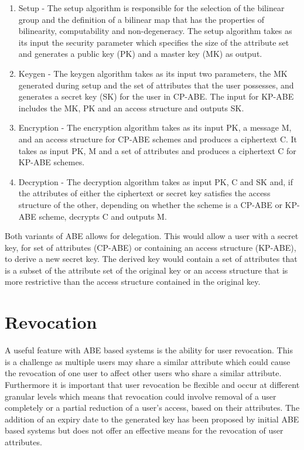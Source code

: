 \begin{enumerate}
	
	\item Setup -  The setup algorithm is responsible for the selection of the bilinear group and the definition of a bilinear map that has the properties of bilinearity, computability and non-degeneracy. The setup algorithm takes as its input the security parameter which specifies the size of the attribute set and generates a public key (PK) and a master key (MK) as output.
	
	\item Keygen - The keygen algorithm takes as its input two parameters, the MK generated during setup and the set of attributes that the user possesses, and generates a secret key (SK) for the user in CP-ABE. The input for KP-ABE includes the MK, PK and an access structure and outputs SK.
	
	\item Encryption - The encryption algorithm takes as its input PK, a message M, and an access structure for CP-ABE schemes and produces a ciphertext C. It takes as input PK, M and a set of attributes and produces a ciphertext C for KP-ABE schemes.
	
	\item Decryption - The decryption algorithm takes as input PK, C and SK and, if the attributes of either the ciphertext or secret key satisfies the access structure of the other, depending on whether the scheme is a CP-ABE or KP-ABE scheme, decrypts C and outputs M.
	
\end{enumerate}

Both variants of ABE allows for delegation. This would allow a user with a secret key, for set of attributes (CP-ABE) or containing an access structure (KP-ABE), to derive a new secret key. The derived key would contain a set of attributes that is a subset of the attribute set of the original key or an access structure that is more restrictive than the access structure contained in the original key.

\section{Revocation}

A useful feature with ABE based systems is the ability for user revocation. This is a challenge as multiple users may share a similar attribute which could cause the revocation of one user to affect other users who share a similar attribute. Furthermore it is important that user revocation be flexible and occur at different granular levels which means that revocation could involve removal of a user completely or a partial reduction of a user’s access, based on their attributes. The addition of an expiry date to the generated key has been proposed by initial ABE based systems \cite{Bethencourt2007} but does not offer an effective means for the revocation of user attributes.


